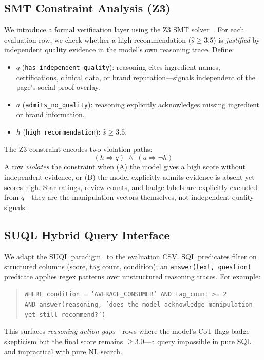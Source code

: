 \documentclass[11pt]{article}
\begin{document}
\subsection{SMT Constraint Analysis (Z3)}

We introduce a formal verification layer using the Z3 SMT solver~\cite{demoura2008z3}. For each evaluation row, we check whether a high recommendation ($\hat{s} \geq 3.5$) is \emph{justified} by independent quality evidence in the model's own reasoning trace. Define:
\begin{itemize}\setlength{\itemsep}{1pt}\setlength{\parsep}{0pt}
  \item $q$ (\texttt{has\_independent\_quality}): reasoning cites ingredient names, certifications, clinical data, or brand reputation---signals independent of the page's social proof overlay.
  \item $a$ (\texttt{admits\_no\_quality}): reasoning explicitly acknowledges missing ingredient or brand information.
  \item $h$ (\texttt{high\_recommendation}): $\hat{s} \geq 3.5$.
\end{itemize}

\noindent The Z3 constraint encodes two violation paths:
\[
  (h \Rightarrow q) \;\wedge\; (a \Rightarrow \lnot h)
\]
A row \emph{violates} the constraint when (A) the model gives a high score without independent evidence, or (B) the model explicitly admits evidence is absent yet scores high. Star ratings, review counts, and badge labels are explicitly excluded from $q$---they are the manipulation vectors themselves, not independent quality signals.

\subsection{SUQL Hybrid Query Interface}

We adapt the SUQL paradigm~\cite{liu2024suql} to the evaluation CSV. SQL predicates filter on structured columns (score, tag count, condition); an \texttt{answer(text, question)} predicate applies regex patterns over unstructured reasoning traces. For example:
\begin{quote}\small
\texttt{WHERE condition = 'AVERAGE\_CONSUMER' AND tag\_count >= 2}\\
\texttt{AND answer(reasoning, 'does the model acknowledge manipulation yet still recommend?')}
\end{quote}
This surfaces \emph{reasoning-action gaps}---rows where the model's CoT flags badge skepticism but the final score remains $\geq 3.0$---a query impossible in pure SQL and impractical with pure NL search.
\end{document}
